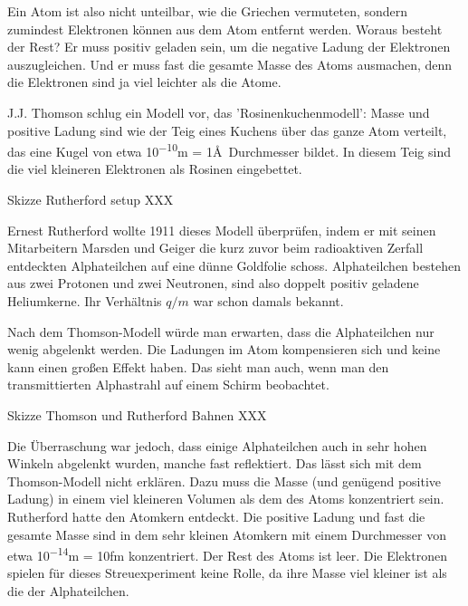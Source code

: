 Ein Atom ist also nicht unteilbar, wie die Griechen vermuteten, sondern zumindest Elektronen können aus dem Atom entfernt werden. Woraus besteht der Rest? Er muss positiv geladen sein, um die negative Ladung der Elektronen auszugleichen. Und er muss fast die gesamte Masse des Atoms ausmachen, denn die Elektronen sind ja viel leichter als die Atome.

J.J. Thomson schlug ein Modell vor, das 'Rosinenkuchenmodell': Masse und positive Ladung sind wie der Teig eines Kuchens über das ganze Atom verteilt, das eine Kugel von etwa \si{10^{-10}}{m} = 1\AA\ Durchmesser bildet. In diesem Teig sind die viel kleineren Elektronen als Rosinen eingebettet.



\begin{marginfigure}
    \caption{Skizze Rutherford setup XXX}
\end{marginfigure}

Ernest Rutherford wollte 1911 dieses Modell überprüfen, indem er mit seinen Mitarbeitern Marsden und Geiger die kurz zuvor beim radioaktiven Zerfall entdeckten Alphateilchen auf eine dünne Goldfolie schoss. Alphateilchen bestehen aus zwei Protonen und zwei Neutronen, sind also doppelt positiv geladene Heliumkerne. Ihr Verhältnis $q/m$ war schon damals bekannt.

Nach dem Thomson-Modell würde man erwarten, dass die Alphateilchen nur wenig abgelenkt werden. Die Ladungen im Atom kompensieren sich und keine kann einen großen Effekt haben. Das sieht man auch, wenn man den transmittierten Alphastrahl auf einem Schirm beobachtet.

\begin{marginfigure}
    \caption{Skizze Thomson und  Rutherford Bahnen XXX}
\end{marginfigure}

Die Überraschung war jedoch, dass einige Alphateilchen auch in sehr hohen Winkeln abgelenkt wurden, manche fast reflektiert. Das lässt sich mit dem Thomson-Modell nicht erklären. Dazu muss die Masse (und genügend positive Ladung) in einem viel kleineren Volumen als dem des Atoms konzentriert sein. Rutherford hatte den Atomkern entdeckt. Die positive Ladung und fast die gesamte Masse sind in dem sehr kleinen Atomkern mit einem Durchmesser von etwa \si{10^{-14}}{m} = \si{10}{fm} konzentriert. Der Rest des Atoms ist leer. Die Elektronen spielen für dieses Streuexperiment keine Rolle, da ihre Masse viel kleiner ist als die der Alphateilchen.

